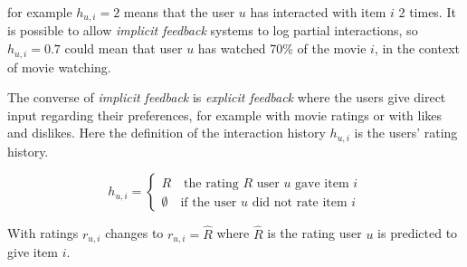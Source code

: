 for example $h_{u, i} = 2$ means that the user $u$ has interacted with item $i$ 2 times. It is possible to allow \textit{implicit feedback} systems to log partial interactions, so $h_{u, i} = 0.7$ could mean that user $u$ has watched 70\% of the movie $i$, in the context of movie watching. \citep{hu2008collaborative}

The converse of \textit{implicit feedback} is \textit{explicit feedback} where the users give direct input regarding their preferences, for example with movie ratings or with likes and dislikes.  Here the definition of the interaction history $h_{u, i}$ is the users' rating history.

\begin{equation}
    h_{u, i} = \begin{cases}
        R \quad \text{the rating $R$ user $u$ gave item $i$} \\
        \emptyset \quad \text{if the user $u$ did not rate item $i$}
    \end{cases}
\end{equation}


With ratings $r_{u, i}$ changes to $r_{u, i} = \hat{R}$ where $\hat{R}$ is the rating user $u$ is predicted to give item $i$.
